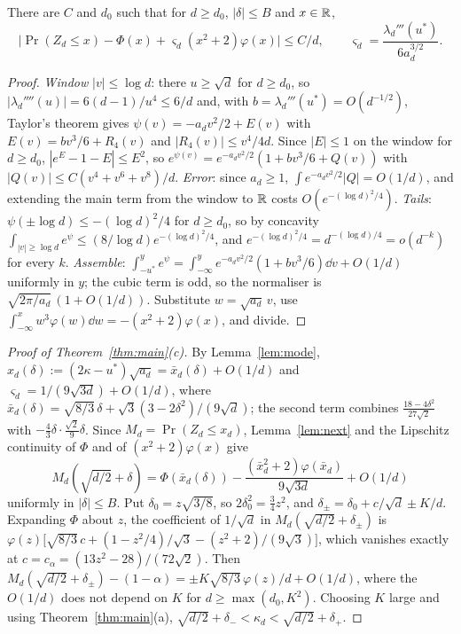 \begin{lemma}\label{lem:next}
There are $C$ and $d_0$ such that for $d \ge d_0$, $|\delta| \le B$ and $x \in \mathbb{R}$,
\[ \bigl|\Pr(Z_d \le x) - \Phi(x) + \varsigma_d(x^2 + 2)\varphi(x)\bigr| \le C/d, \qquad
   \varsigma_d = \frac{\lambda_d'''(u^*)}{6a_d^{3/2}}. \]
\end{lemma}

\begin{proof}
\emph{Window} $|v| \le \log d$: there $u \ge \sqrt d$ for $d \ge d_0$, so $|\lambda_d''''(u)| = 6(d-1)/u^4 \le 6/d$
and, with $b = \lambda_d'''(u^*) = O(d^{-1/2})$, Taylor's theorem gives $\psi(v) = -a_dv^2/2 + E(v)$ with
$E(v) = bv^3/6 + R_4(v)$ and $|R_4(v)| \le v^4/4d$. Since $|E| \le 1$ on the window for $d \ge d_0$,
$|e^E - 1 - E| \le E^2$, so $e^{\psi(v)} = e^{-a_dv^2/2}(1 + bv^3/6 + Q(v))$ with $|Q(v)| \le C(v^4 + v^6 + v^8)/d$.
\emph{Error}: since $a_d \ge 1$, $\int e^{-a_dv^2/2}|Q| = O(1/d)$, and extending the main term from the window to $\mathbb{R}$ costs
$O(e^{-(\log d)^2/4})$. \emph{Tails}: $\psi(\pm\log d) \le -(\log d)^2/4$ for $d \ge d_0$, so by concavity
$\int_{|v| \ge \log d} e^\psi \le (8/\log d)e^{-(\log d)^2/4}$, and $e^{-(\log d)^2/4} = d^{-(\log d)/4} = o(d^{-k})$ for every $k$.
\emph{Assemble}: $\int_{-u^*}^{y} e^\psi = \int_{-\infty}^{y} e^{-a_dv^2/2}(1 + bv^3/6)\dd v + O(1/d)$ uniformly in $y$; the
cubic term is odd, so the normaliser is $\sqrt{2\pi/a_d}\,(1 + O(1/d))$. Substitute $w = \sqrt{a_d}\,v$, use
$\int_{-\infty}^x w^3\varphi(w)\dd w = -(x^2 + 2)\varphi(x)$, and divide.
\end{proof}

\begin{proof}[Proof of Theorem~\ref{thm:main}(c)]
By Lemma~\ref{lem:mode}, $x_d(\delta) := (2\kappa - u^*)\sqrt{a_d} = \bar x_d(\delta) + O(1/d)$ and
$\varsigma_d = 1/(9\sqrt{3d}) + O(1/d)$, where $\bar x_d(\delta) = \sqrt{8/3}\,\delta + \sqrt3(3 - 2\delta^2)/(9\sqrt d)$;
the second term combines $\frac{18 - 4\delta^2}{27\sqrt2}$ with $-\tfrac43\delta\cdot\tfrac{\sqrt2}{9}\delta$. Since
$M_d = \Pr(Z_d \le x_d)$, Lemma~\ref{lem:next} and the Lipschitz continuity of $\Phi$ and of $(x^2 + 2)\varphi(x)$ give
\[ M_d(\sqrt{d/2} + \delta) = \Phi(\bar x_d(\delta)) - \frac{(\bar x_d^2 + 2)\varphi(\bar x_d)}{9\sqrt{3d}} + O(1/d) \]
uniformly in $|\delta| \le B$. Put $\delta_0 = z\sqrt{3/8}$, so $2\delta_0^2 = \tfrac34 z^2$, and
$\delta_\pm = \delta_0 + c/\sqrt d \pm K/d$. Expanding $\Phi$ about $z$, the coefficient of $1/\sqrt d$ in
$M_d(\sqrt{d/2} + \delta_\pm)$ is $\varphi(z)\bigl[\sqrt{8/3}\,c + (1 - z^2/4)/\sqrt3 - (z^2 + 2)/(9\sqrt3)\bigr]$, which
vanishes exactly at $c = c_\alpha = (13z^2 - 28)/(72\sqrt2)$. Then
$M_d(\sqrt{d/2} + \delta_\pm) - (1 - \alpha) = \pm K\sqrt{8/3}\,\varphi(z)/d + O(1/d)$, where the $O(1/d)$ does not
depend on $K$ for $d \ge \max(d_0, K^2)$. Choosing $K$ large and using Theorem~\ref{thm:main}(a),
$\sqrt{d/2} + \delta_- < \kappa_d < \sqrt{d/2} + \delta_+$.
\end{proof}

